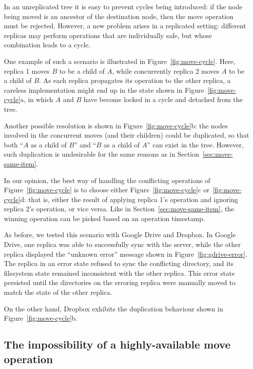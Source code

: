 \documentclass[sigconf]{acmart}
\begin{document}
In an unreplicated tree it is easy to prevent cycles being introduced: if the node being moved is an ancestor of the destination node, then the move operation must be rejected.
However, a new problem arises in a replicated setting: different replicas may perform operations that are individually safe, but whose combination leads to a cycle.

One example of such a scenario is illustrated in Figure~\ref{fig:move-cycle}.
Here, replica 1 moves $B$ to be a child of $A$, while concurrently replica 2 moves $A$ to be a child of $B$.
As each replica propagates its operation to the other replica, a careless implementation might end up in the state shown in Figure~\ref{fig:move-cycle}a, in which $A$ and $B$ have become locked in a cycle and detached from the tree.

Another possible resolution is shown in Figure~\ref{fig:move-cycle}b: the nodes involved in the concurrent moves (and their children) could be duplicated, so that both ``$A$ as a child of $B$'' and ``$B$ as a child of $A$'' can exist in the tree.
However, such duplication is undesirable for the same reasons as in Section~\ref{sec:move-same-item}.

In our opinion, the best way of handling the conflicting operations of Figure~\ref{fig:move-cycle} is to choose either Figure~\ref{fig:move-cycle}c or~\ref{fig:move-cycle}d: that is, either the result of applying replica 1's operation and ignoring replica 2's operation, or vice versa.
Like in Section~\ref{sec:move-same-item}, the winning operation can be picked based on an operation timestamp.

As before, we tested this scenario with Google Drive and Dropbox.
In Google Drive, one replica was able to successfully sync with the server, while the other replica displayed the ``unknown error'' message shown in Figure~\ref{fig:gdrive-error}.
The replica in an error state refused to sync the conflicting directory, and its filesystem state remained inconsistent with the other replica.
This error state persisted until the directories on the erroring replica were manually moved to match the state of the other replica.

On the other hand, Dropbox exhibits the duplication behaviour shown in Figure~\ref{fig:move-cycle}b.

\subsection{The impossibility of a highly-available move operation}\label{sec:impossibility}
\end{document}
